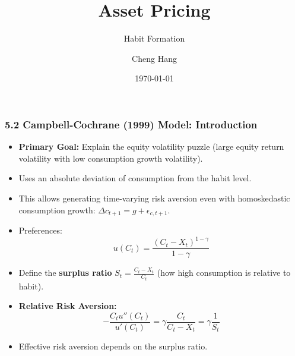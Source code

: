 \documentclass{beamer}
\title[Asset Pricing]{\textbf{Asset Pricing}} %
\subtitle{Habit Formation}
\author[Cheng Hang]{Cheng Hang} %
\institute[DUFE] %
{School of Fintech \\
Dongbei University of Finance \& Economics \\ %
\medskip
\textbf{chenghangch@qq.com}%
}
\date{\today} %
\begin{document}
\begin{frame}
\titlepage %
\end{frame}

\begin{frame}
    \frametitle{5.2 Campbell-Cochrane (1999) Model: Introduction}
    \begin{itemize}
        \item \textbf{Primary Goal:} Explain the equity volatility puzzle (large equity return volatility with low consumption growth volatility).
        \item Uses an absolute deviation of consumption from the habit level.
        \item This allows generating time-varying risk aversion even with homoskedastic consumption growth: $\Delta c_{t+1} = g + \epsilon_{c,t+1}$.
        \item Preferences:
        \[ u(C_t) = \frac{(C_t - X_t)^{1-\gamma}}{1-\gamma} \]
        \item Define the \textbf{surplus ratio} $S_t = \frac{C_t - X_t}{C_t}$ (how high consumption is relative to habit).
        \item \textbf{Relative Risk Aversion:}
        \[ -\frac{C_t u''(C_t)}{u'(C_t)} = \gamma \frac{C_t}{C_t - X_t} = \gamma \frac{1}{S_t} \]
        \item Effective risk aversion depends on the surplus ratio.
    \end{itemize}
\end{frame}
\end{document}

